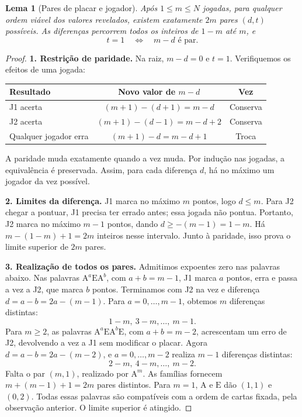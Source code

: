 \documentclass[11pt,a4paper]{article}
\newtheorem{lema}[proposicao]{Lema}
\theoremstyle{definition}
\newcommand{\A}{\mathrm{A}}
\newcommand{\Er}{\mathrm{E}}
\begin{document}
\begin{lema}[Pares de placar e jogador]\label{lem:pares}
Após $1\le m\le N$ jogadas, para qualquer ordem viável dos valores revelados, existem exatamente $2m$ pares $(d,t)$ possíveis. As diferenças percorrem todos os inteiros de $1-m$ até $m$, e
\[
t=1\quad\Longleftrightarrow\quad m-d\text{ é par}.
\]
\end{lema}

\begin{proof}
\textbf{1. Restrição de paridade.} Na raiz, $m-d=0$ e $t=1$. Verifiquemos os efeitos de uma jogada:
\begin{center}
\begin{tabular}{@{}lcc@{}}
\toprule
Resultado & Novo valor de $m-d$ & Vez\\
\midrule
J1 acerta & $(m+1)-(d+1)=m-d$ & Conserva\\
J2 acerta & $(m+1)-(d-1)=m-d+2$ & Conserva\\
Qualquer jogador erra & $(m+1)-d=m-d+1$ & Troca\\
\bottomrule
\end{tabular}
\end{center}
A paridade muda exatamente quando a vez muda. Por indução nas jogadas, a equivalência é preservada. Assim, para cada diferença $d$, há no máximo um jogador da vez possível.

\textbf{2. Limites da diferença.} J1 marca no máximo $m$ pontos, logo $d\le m$. Para J2 chegar a pontuar, J1 precisa ter errado antes; essa jogada não pontua. Portanto, J2 marca no máximo $m-1$ pontos, dando $d\ge -(m-1)=1-m$. Há $m-(1-m)+1=2m$ inteiros nesse intervalo. Junto à paridade, isso prova o limite superior de $2m$ pares.

\textbf{3. Realização de todos os pares.} Admitimos expoentes zero nas palavras abaixo. Nas palavras $\A^a\Er\A^b$, com $a+b=m-1$, J1 marca $a$ pontos, erra e passa a vez a J2, que marca $b$ pontos. Terminamos com J2 na vez e diferença $d=a-b=2a-(m-1)$. Para $a=0,\ldots,m-1$, obtemos $m$ diferenças distintas:
\[
1-m,\ 3-m,\ldots,\ m-1.
\]
Para $m\ge2$, as palavras $\A^a\Er\A^b\Er$, com $a+b=m-2$, acrescentam um erro de J2, devolvendo a vez a J1 sem modificar o placar. Agora $d=a-b=2a-(m-2)$, e $a=0,\ldots,m-2$ realiza $m-1$ diferenças distintas:
\[
2-m,\ 4-m,\ldots,\ m-2.
\]
Falta o par $(m,1)$, realizado por $\A^m$. As famílias fornecem $m+(m-1)+1=2m$ pares distintos. Para $m=1$, $\A$ e $\Er$ dão $(1,1)$ e $(0,2)$. Todas essas palavras são compatíveis com a ordem de cartas fixada, pela observação anterior. O limite superior é atingido.
\end{proof}
\end{document}
